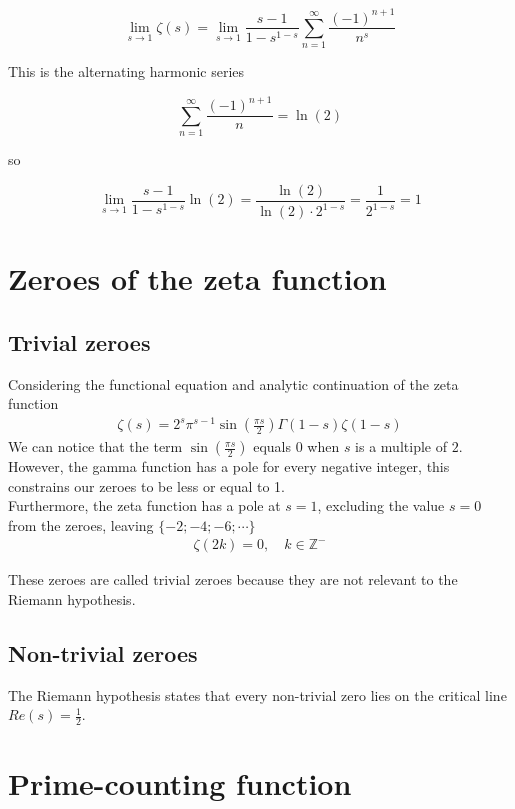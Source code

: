 \documentclass[a4paper]{article}
\begin{document}
\[
    \lim_{s\to 1} \zeta(s) =
    \lim_{s\to 1} \frac{s-1}{1-s^{1-s}} \sum_{n=1}^{\infty} \frac{{(-1)}^{n+1}}{n^s}
\]

This is the alternating harmonic series

\[
    \sum_{n=1}^{\infty} \frac{{(-1)}^{n+1}}{n}=\ln(2)
\]

so

\[
    \lim_{s\to 1} \frac{s-1}{1-s^{1-s}} \ln(2)
    = \frac{\ln(2)}{\ln(2) \cdot 2^{1-s}}
    = \frac{1}{2^{1-s}} = 1
\]

\section{Zeroes of the zeta function}

\subsection{Trivial zeroes}

Considering the functional equation and analytic continuation of the zeta function
\begin{align*}
    \zeta(s)=2^s\pi^{s-1}\sin\left(\frac{\pi s}{2}\right)\Gamma(1-s)\zeta(1-s)
\end{align*}
We can notice that the term \(\sin\left(\frac{\pi s}{2}\right)\) equals \(0\) when \(s\) is a multiple of \(2\).
\\
However, the gamma function has a pole for every negative integer, this constrains our zeroes to be less or equal to 1.\\
Furthermore, the zeta function has a pole at \(s=1\), excluding the value \(s=0\) from the zeroes, leaving \(\{-2;-4;-6;\cdots\}\)
\begin{align*}
    \zeta(2k)=0,
    \quad k\in \mathbb{Z}^{-}
\end{align*}

These zeroes are called trivial zeroes because they are not relevant to the Riemann hypothesis.

\subsection{Non-trivial zeroes}

The Riemann hypothesis states that every non-trivial zero lies on the critical line \(Re(s)=\frac{1}{2}\).

\pagebreak

\section{Prime-counting function}
\end{document}
